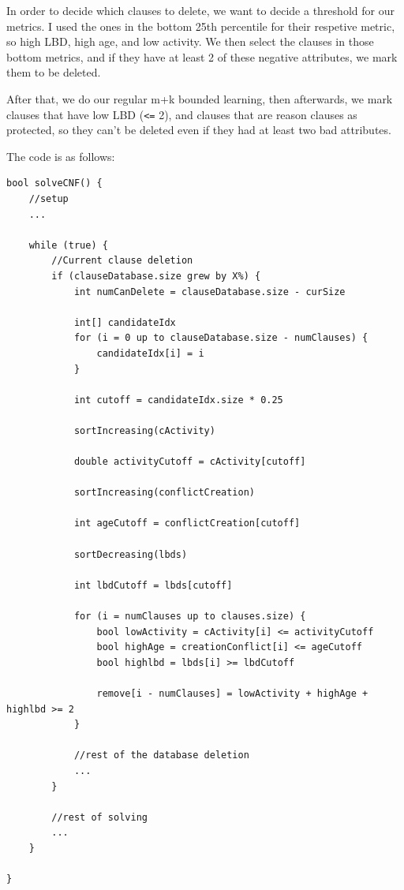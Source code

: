 \documentclass[../main.tex]{subfiles}
\begin{document}
In order to decide which clauses to delete, we want to decide a threshold for our 
metrics. I used the ones in the bottom 25th percentile for their respetive metric, 
so high LBD, high age, and low activity. We then select the clauses in those 
bottom metrics, and if they have at least 2 of these negative attributes, we mark 
them to be deleted. 

After that, we do our regular m+k bounded learning, then afterwards, we mark clauses 
that have low LBD (\verb|<=| 2), and clauses that are reason clauses as protected, 
so they can't be deleted even if they had at least two bad attributes.

The code is as follows:
\begin{lstlisting}
bool solveCNF() {
    //setup
    ... 

    while (true) {
        //Current clause deletion
        if (clauseDatabase.size grew by X%) {
            int numCanDelete = clauseDatabase.size - curSize

            int[] candidateIdx
            for (i = 0 up to clauseDatabase.size - numClauses) {
                candidateIdx[i] = i
            }

            int cutoff = candidateIdx.size * 0.25

            sortIncreasing(cActivity)

            double activityCutoff = cActivity[cutoff]

            sortIncreasing(conflictCreation)

            int ageCutoff = conflictCreation[cutoff]

            sortDecreasing(lbds)

            int lbdCutoff = lbds[cutoff]

            for (i = numClauses up to clauses.size) {
                bool lowActivity = cActivity[i] <= activityCutoff
                bool highAge = creationConflict[i] <= ageCutoff
                bool highlbd = lbds[i] >= lbdCutoff

                remove[i - numClauses] = lowActivity + highAge + highlbd >= 2
            }

            //rest of the database deletion
            ...
        }

        //rest of solving
        ...
    }

}
\end{lstlisting}
\end{document}
